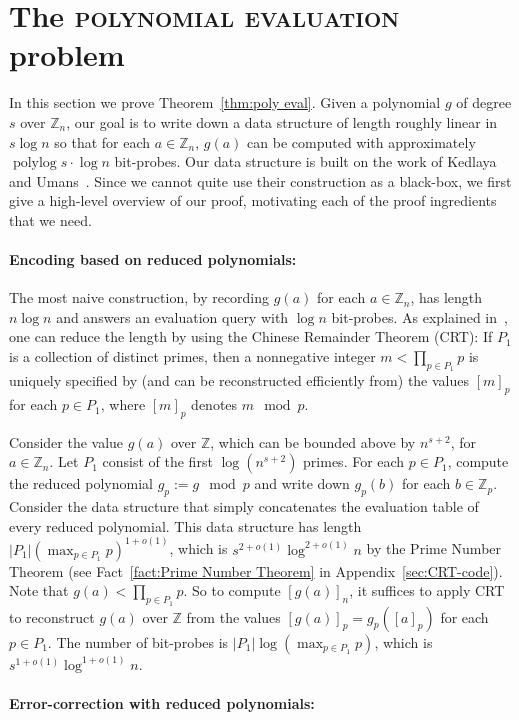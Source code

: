 \documentclass[11pt,english]{article}
\newcommand{\noun}[1]{\textsc{#1}}
\theoremstyle{definition}
\theoremstyle{remark}
\newcommand{\Z}{\mathbb{Z}}
\newcommand{\polylog}{\operatorname{polylog} }
\begin{document}
\section{The \noun{polynomial evaluation} problem\label{sec:polynomial evaluation}}

In this section we prove Theorem~\ref{thm:poly eval}. Given a polynomial
$g$ of degree $s$ over $\Z_{n}$, our goal is to write down a data
structure of length roughly linear in $s\log n$ so that for each
$a\in\Z_{n}$, $g(a)$ can be computed with approximately $\polylog s\cdot\log n$
bit-probes. Our data structure is built on the work of Kedlaya and
Umans~\cite{kedl-umans}. Since we cannot quite use their construction
as a black-box, we first give a high-level overview of our proof,
motivating each of the proof ingredients that we need.

\paragraph{\textbf{Encoding based on reduced polynomials:}}

The most naive construction, by recording $g(a)$ for each $a\in\Z_{n}$,
has length $n\log n$ and answers an evaluation query with $\log n$
bit-probes. As explained in~\cite{kedl-umans}, one can
reduce the length by using the Chinese Remainder Theorem (CRT): If
$P_{1}$ is a collection of distinct primes, then a nonnegative integer
$m<\prod_{p\in P_{1}}p$ is uniquely specified by (and can be reconstructed
efficiently from) the values $[m]_{p}$ for each $p\in P_{1}$, where
$[m]_{p}$ denotes $m\mod p$. 

Consider the value $g(a)$ over $\Z$, which can be bounded above
by $n^{s+2}$, for $a\in\Z_{n}.$ Let $P_{1}$ consist of the first
$\log(n^{s+2})$ primes. For each $p\in P_{1}$, compute the reduced
polynomial $g_{p}:=g\mod p$ and write down $g_{p}(b)$ for each $b\in\Z_{p}$.
Consider the data structure that simply concatenates the evaluation
table of every reduced polynomial. This data structure has length
$|P_{1}|(\max_{p\in P_{1}}p)^{1+o(1)}$, which is $s^{2+o(1)}\log^{2+o(1)}n$
by the Prime Number Theorem (see Fact~\ref{fact:Prime Number Theorem}
in Appendix~\ref{sec:CRT-code}). Note that $g(a)<\prod_{p\in P_{1}}p$. 
So to compute $[g(a)]_{n}$, it suffices to apply CRT to reconstruct
$g(a)$ over $\Z$ from the values $[g(a)]_{p}=g_{p}([a]_{p})$ for
each $p\in P_{1}$. The number of bit-probes is $|P_{1}|\log(\max_{p\in P_{1}}p)$,
which is $s^{1+o(1)}\log^{1+o(1)}n$. 

\paragraph{\textbf{Error-correction with reduced polynomials:}}
\end{document}
